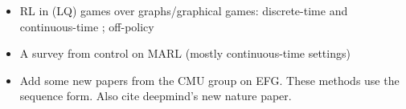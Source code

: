\begin{itemize}

 
\item RL in (LQ) games over graphs/graphical games: discrete-time \cite{abouheaf2014multi} and  continuous-time \cite{vamvoudakis2012multi}; off-policy \cite{li2017off}
\item A survey from control on MARL \cite{vamvoudakis2017game} (mostly continuous-time settings) 

\item Add some new papers from the CMU group on EFG. These methods use the sequence form. Also cite deepmind's new nature paper.

\end{itemize}


 \fi 



